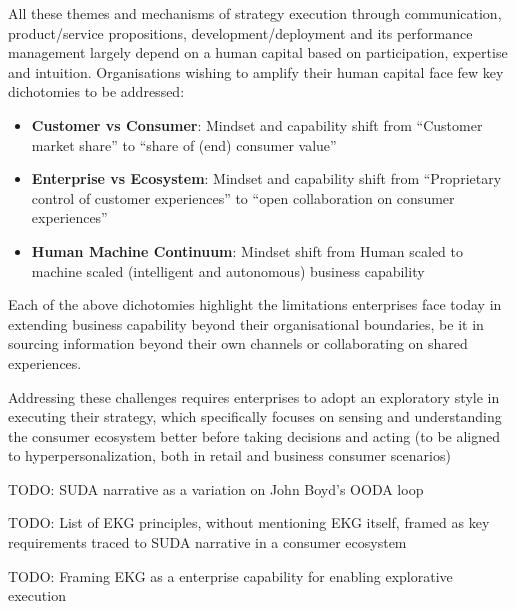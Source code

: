 All these themes and mechanisms of strategy execution through communication, product/service propositions,
development/deployment and its performance management largely depend on a human capital based on participation,
expertise and intuition.
Organisations wishing to amplify their human capital face few key dichotomies to be addressed:
\begin{itemize}
    \item \textbf{Customer vs Consumer}: Mindset and capability shift from “Customer market share” to
          “share of (end) consumer value”
    \item \textbf{Enterprise vs Ecosystem}: Mindset and capability shift from
          “Proprietary control of customer experiences” to “open collaboration on consumer experiences”
    \item \textbf{Human Machine Continuum}: Mindset shift from Human scaled to machine scaled
          (intelligent and autonomous) business capability
\end{itemize}
Each of the above dichotomies highlight the limitations enterprises face today in extending business capability
beyond their organisational boundaries, be it in sourcing information beyond their own channels or collaborating
on shared experiences.

Addressing these challenges requires enterprises to adopt an exploratory style in executing their strategy,
which specifically focuses on sensing and understanding the consumer ecosystem better before taking decisions
and acting (to be aligned to hyperpersonalization, both in retail and business consumer scenarios)

TODO: SUDA narrative as a variation on John Boyd’s OODA loop

TODO: List of EKG principles, without mentioning EKG itself, framed as key requirements traced to SUDA narrative
in a consumer ecosystem

TODO: Framing EKG as a enterprise capability for enabling explorative execution